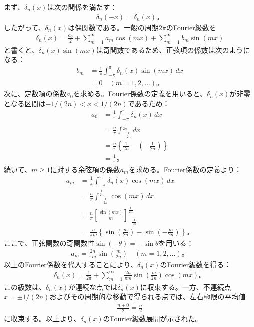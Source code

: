 \documentclass[platex,dvipdfmx,a4paper]{jsarticle}
\begin{document}
  まず、$\delta_n(x)$は次の関係を満たす：
  \begin{align*}
    \delta_n(-x)=\delta_n(x)。
  \end{align*}
  したがって、$\delta_n(x)$は偶関数である。一般の周期$2\pi$のFourier級数を
  \begin{align*}
    \delta_n(x)=\frac{a_0}{2}+\sum_{m=1}^{\infty}a_m\cos(mx)+\sum_{m=1}^{\infty}b_m\sin(mx)
  \end{align*}
  と書くと、$\delta_n(x)\sin(mx)$は奇関数であるため、正弦項の係数は次のようになる：
  \begin{align*}
    b_m
    &=\frac{1}{\pi}\int_{-\pi}^{\pi}\delta_n(x)\sin(mx)\,dx\\
    &=0\quad(m=1,2,\dots)。
  \end{align*}
  次に、定数項の係数$a_0$を求める。Fourier係数の定義を用いると、$\delta_n(x)$が非零となる区間は$-1/(2n)<x<1/(2n)$であるため：
  \begin{align*}
    a_0
    &=\frac{1}{\pi}\int_{-\pi}^{\pi}\delta_n(x)\,dx\\
    &=\frac{n}{\pi}\int_{-\frac{1}{2n}}^{\frac{1}{2n}}dx\\
    &=\frac{n}{\pi}\left\{\frac{1}{2n}-\left(-\frac{1}{2n}\right)\right\}\\
    &=\frac{1}{\pi}。
  \end{align*}
  続いて、$m\geq 1$に対する余弦項の係数$a_m$を求める。Fourier係数の定義より：
  \begin{align*}
    a_m
    &=\frac{1}{\pi}\int_{-\pi}^{\pi}\delta_n(x)\cos(mx)\,dx\\
    &=\frac{n}{\pi}\int_{-\frac{1}{2n}}^{\frac{1}{2n}}\cos(mx)\,dx\\
    &=\frac{n}{\pi}\left[\frac{\sin(mx)}{m}\right]_{-\frac{1}{2n}}^{\frac{1}{2n}}\\
    &=\frac{n}{\pi m}\left\{\sin\left(\frac{m}{2n}\right)-\sin\left(-\frac{m}{2n}\right)\right\}。
  \end{align*}
  ここで、正弦関数の奇関数性$\sin(-\theta)=-\sin\theta$を用いる：
  \begin{align*}
    a_m=\frac{2n}{\pi m}\sin\left(\frac{m}{2n}\right)\quad(m=1,2,\dots)。
  \end{align*}
  以上のFourier係数を代入することにより、$\delta_n(x)$のFourier級数を得る：
  \begin{align*}
    \delta_n(x)
    =\frac{1}{2\pi}
    +\sum_{m=1}^{\infty}\frac{2n}{\pi m}\sin\left(\frac{m}{2n}\right)\cos(mx)。
  \end{align*}
  この級数は、$\delta_n(x)$が連続な点では$\delta_n(x)$に収束する。一方、不連続点$x=\pm1/(2n)$およびその周期的な移動で得られる点では、左右極限の平均値
  \begin{align*}
    \frac{n+0}{2}=\frac{n}{2}
  \end{align*}
  に収束する。以上より、$\delta_n(x)$のFourier級数展開が示された。
\end{document}

